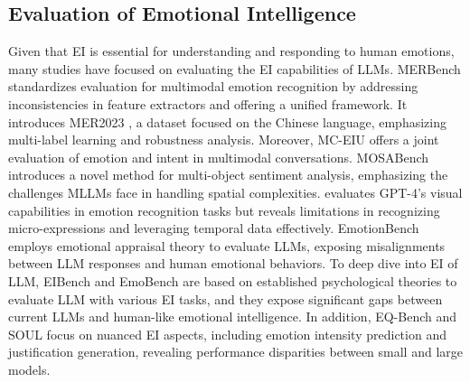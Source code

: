 \subsection{Evaluation of Emotional Intelligence}
Given that EI is essential for understanding and responding to human emotions, many studies have focused on evaluating the EI capabilities of LLMs. MERBench \cite{MERBench} standardizes evaluation for multimodal emotion recognition by addressing inconsistencies in feature extractors and offering a unified framework. It introduces MER2023 \cite{mer2023}, a dataset focused on the Chinese language, emphasizing multi-label learning and robustness analysis.
Moreover, MC-EIU \cite{MC-EIU} offers a joint evaluation of emotion and intent in multimodal conversations.
MOSABench \cite{MOSABench} introduces a novel method for multi-object sentiment analysis, emphasizing the challenges MLLMs face in handling spatial complexities.
\citet{GPT-4V} evaluates GPT-4's visual capabilities in emotion recognition tasks but reveals limitations in recognizing micro-expressions and leveraging temporal data effectively. EmotionBench \cite{EmotionBench} employs emotional appraisal theory to evaluate LLMs, exposing misalignments between LLM responses and human emotional behaviors. To deep dive into EI of LLM,  EIBench \cite{Both_Matter} and EmoBench \cite{EmoBench} are based on established psychological theories to evaluate LLM with various EI tasks, and they expose significant gaps between current LLMs and human-like emotional intelligence. In addition, EQ-Bench \cite{EQ-Bench} and SOUL \cite{SOUL} focus on nuanced EI aspects, including emotion intensity prediction and justification generation, revealing performance disparities between small and large models. 



